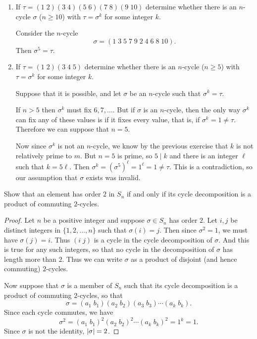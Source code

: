 \begin{enumerate}
\item If $\tau = (1\;2)(3\;4)(5\;6)(7\;8)(9\;10)$ determine whether
  there is an $n$-cycle $\sigma$ ($n\geq10$) with $\tau = \sigma^k$
  for some integer $k$.
  \begin{solution}
    Consider the $n$-cycle
    \begin{equation*}
      \sigma = (1\;3\;5\;7\;9\;2\;4\;6\;8\;10).
    \end{equation*}
    Then $\sigma^5 = \tau$.
  \end{solution}
\item If $\tau = (1\;2)(3\;4\;5)$ determine whether there is an
  $n$-cycle ($n\geq5$) with $\tau = \sigma^k$ for some integer $k$.
  \begin{solution}
    Suppose that it is possible, and let $\sigma$ be an $n$-cycle such
    that $\sigma^k = \tau$.

    If $n>5$ then $\sigma^k$ must fix $6, 7, \dots$. But if $\sigma$
    is an $n$-cycle, then the only way $\sigma^k$ can fix any of these
    values is if it fixes every value, that is, if
    $\sigma^k = 1 \neq \tau$. Therefore we can suppose that $n = 5$.

    Now since $\sigma^k$ is not an $n$-cycle, we know by the previous
    exercise that $k$ is not relatively prime to $m$. But $n = 5$ is
    prime, so $5\mid k$ and there is an integer $\ell$ such that
    $k = 5\ell$. Then
    $\sigma^k = (\sigma^5)^\ell = 1^\ell = 1\neq\tau$. This is a
    contradiction, so our assumption that $\sigma$ exists was invalid.
  \end{solution}
\end{enumerate}

 Show that an element has order $2$ in $S_n$ if and only
if its cycle decomposition is a product of commuting $2$-cycles.
\begin{proof}
  Let $n$ be a positive integer and suppose $\sigma\in S_n$ has order
  $2$. Let $i,j$ be distinct integers in $\{1, 2, \dots, n\}$ such
  that $\sigma(i) = j$. Then since $\sigma^2 = 1$, we must have
  $\sigma(j) = i$. Thus $(i\;j)$ is a cycle in the cycle decomposition
  of $\sigma$. And this is true for any such integers, so that no
  cycle in the decomposition of $\sigma$ has length more than
  $2$. Thus we can write $\sigma$ as a product of disjoint (and hence
  commuting) $2$-cycles.

  Now suppose that $\sigma$ is a member of $S_n$ such that its cycle
  decomposition is a product of commuting $2$-cycles, so that
  \begin{equation*}
    \sigma = (a_1\;b_1)(a_2\;b_2)(a_3\;b_3)\cdots(a_k\;b_k).
  \end{equation*}
  Since each cycle commutes, we have
  \begin{equation*}
    \sigma^2 = (a_1\;b_1)^2(a_2\;b_2)^2\cdots(a_k\;b_k)^2 = 1^k = 1.
  \end{equation*}
  Since $\sigma$ is not the identity, $\lvert{\sigma}\rvert = 2$.
\end{proof}

